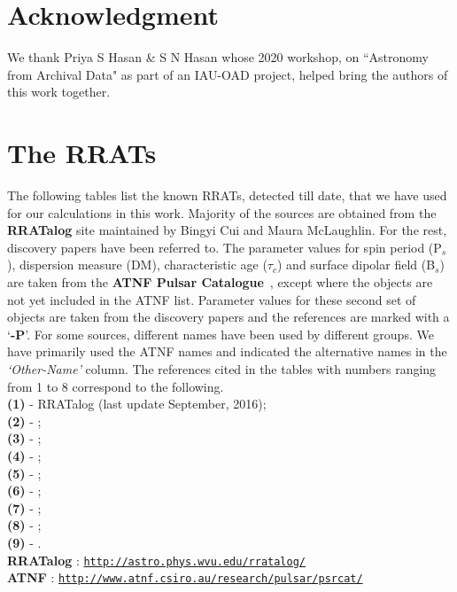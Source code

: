 \documentclass{jaa}
\begin{document}
\section{Acknowledgment}
%
We thank Priya S Hasan \& S N Hasan whose 2020 workshop, on ``Astronomy
from Archival  Data" as part of  an IAU-OAD project, helped  bring the
authors of this work together.
%

\label{lastpage}




\appendix

\onecolumn

\section{The RRATs}
\label{append}
%
\begin{minipage}{0.95\textwidth}
%
The following tables list the known RRATs, detected till date, that we have used for our calculations in this work. Majority of the sources are obtained from the {\bf RRATalog} site maintained by Bingyi Cui and Maura McLaughlin. For the rest, discovery papers have been referred to. The parameter values for spin period (P$_s$), dispersion measure (DM), characteristic age ($\tau_c$) and surface dipolar field (B$_s$) are taken from the {\bf ATNF Pulsar Catalogue}~\cite{manch05b}, except where the objects are not yet included in the ATNF list. Parameter values for these second set of objects are taken from the discovery papers and the references are marked with a `{\bf -P}'. For some sources, different names have been used by different groups. We have primarily used the ATNF names and indicated the alternative names in the {\em `Other-Name'} column. The references cited in the tables with numbers ranging from 1 to 8 correspond to the following. \\

{\bf (1)} - RRATalog (last update September, 2016); \\
{\bf (2)} - ; \\
{\bf (3)} - ; \\
{\bf (4)} - ; \\
{\bf (5)} - ; \\
{\bf (6)} - ; \\ 
{\bf (7)} - ; \\ 
{\bf (8)} - ; \\ 
{\bf (9)} - . \\
 
{\bf RRATalog} : \underline{\tt http://astro.phys.wvu.edu/rratalog/}  \\

{\bf ATNF} : \underline{\tt http://www.atnf.csiro.au/research/pulsar/psrcat/} 
%
\end{minipage}
\end{document}
